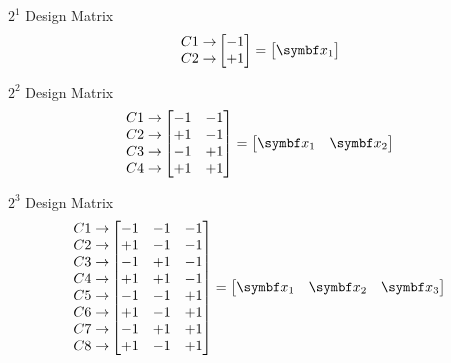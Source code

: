 \begin{Example}{$ 2^1 $ Design Matrix}{}
    \[ \begin{matrix}
            C1\rightarrow \\
            C2\rightarrow
        \end{matrix}\begin{bmatrix}
            -1 \\
            +1
        \end{bmatrix}=\begin{bmatrix}
            \Vector{x}_1
        \end{bmatrix} \]
\end{Example}
\begin{Example}{$ 2^2 $ Design Matrix}{}
    \[ \begin{matrix}
            C1\rightarrow \\
            C2\rightarrow \\
            C3\rightarrow \\
            C4\rightarrow
        \end{matrix}\begin{bmatrix}
            -1 & -1 \\
            +1 & -1 \\
            -1 & +1 \\
            +1 & +1
        \end{bmatrix}=\begin{bmatrix}
            \Vector{x}_1 & \Vector{x}_2
        \end{bmatrix} \]
\end{Example}
\begin{Example}{$ 2^3 $ Design Matrix}{}
    \[ \begin{matrix}
            C1\rightarrow \\
            C2\rightarrow \\
            C3\rightarrow \\
            C4\rightarrow \\
            C5\rightarrow \\
            C6\rightarrow \\
            C7\rightarrow \\
            C8\rightarrow
        \end{matrix}\begin{bmatrix}
            -1 & -1 & -1 \\
            +1 & -1 & -1 \\
            -1 & +1 & -1 \\
            +1 & +1 & -1 \\
            -1 & -1 & +1 \\
            +1 & -1 & +1 \\
            -1 & +1 & +1 \\
            +1 & -1 & +1
        \end{bmatrix}=\begin{bmatrix}
            \Vector{x}_1 & \Vector{x}_2 & \Vector{x}_3
        \end{bmatrix} \]
\end{Example}
